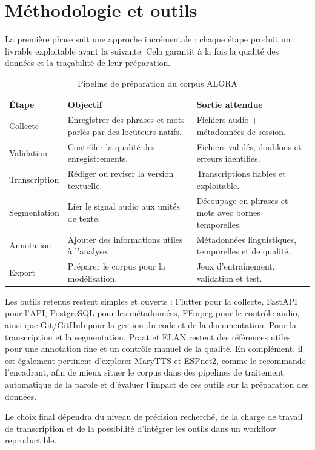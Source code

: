 \section{Méthodologie et outils}

La première phase suit une approche incrémentale : chaque étape produit
un livrable exploitable avant la suivante. Cela garantit à la fois la
qualité des données et la traçabilité de leur préparation.

\begin{table}[H]
\centering
\begin{tabular}{p{2.8cm}p{3.5cm}p{5.8cm}}
\toprule
\textbf{Étape} & \textbf{Objectif} & \textbf{Sortie attendue} \\
\midrule
Collecte & Enregistrer des phrases et mots parlés par des locuteurs natifs. & Fichiers audio + métadonnées de session. \\
Validation & Contrôler la qualité des enregistrements. & Fichiers validés, doublons et erreurs identifiés. \\
Transcription & Rédiger ou reviser la version textuelle. & Transcriptions fiables et exploitable. \\
Segmentation & Lier le signal audio aux unités de texte. & Découpage en phrases et mots avec bornes temporelles. \\
Annotation & Ajouter des informations utiles à l'analyse. & Métadonnées linguistiques, temporelles et de qualité. \\
Export & Préparer le corpus pour la modélisation. & Jeux d'entraînement, validation et test. \\
\bottomrule
\end{tabular}
\caption{Pipeline de préparation du corpus ALORA}
\end{table}

Les outils retenus restent simples et ouverts : Flutter pour la collecte,
FastAPI pour l'API, PostgreSQL pour les métadonnées, FFmpeg pour le
contrôle audio, ainsi que Git/GitHub pour la gestion du code et de la
documentation. Pour la transcription et la segmentation, Praat et ELAN
restent des références utiles pour une annotation fine et un contrôle
manuel de la qualité. En complément, il est également pertinent
d'explorer MaryTTS et ESPnet2, comme le recommande l'encadrant, afin de
mieux situer le corpus dans des pipelines de traitement automatique de
la parole et d'évaluer l'impact de ces outils sur la préparation des
données.

Le choix final dépendra du niveau de précision recherché, de la charge
de travail de transcription et de la possibilité d'intégrer les outils
dans un workflow reproductible.